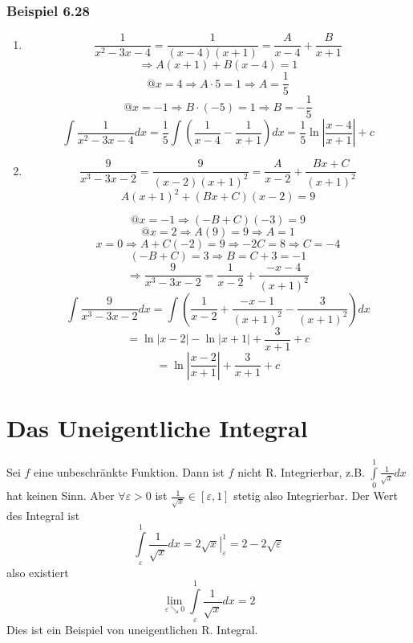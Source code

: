 \subsubsection*{Beispiel 6.28}
\begin{enumerate}
\item $$\frac{1}{x^2 -3x -4}=\frac{1}{(x-4)(x+1)}=\frac{A}{x-4}+\frac{B}{x+1}$$
$$\Rightarrow A(x+1)+B(x-4)=1$$
$$@x=4\Rightarrow A\cdot 5=1\Rightarrow A=\frac{1}{5}$$
$$@x=-1\Rightarrow B\cdot (-5)=1\Rightarrow B=-\frac{1}{5}$$
\[\int {\frac{1}{{{x^2} - 3x - 4}}dx = \frac{1}{5}\int {\left( {\frac{1}{{x - 4}} - \frac{1}{{x + 1}}} \right)dx = \frac{1}{5}} } \ln \left| {\frac{{x - 4}}{{x + 1}}} \right| + c\]
\item \[\frac{9}{{{x^3} - 3x - 2}} = \frac{9}{{(x - 2){{(x + 1)}^2}}} = \frac{A}{{x - 2}} + \frac{{Bx + C}}{{{{(x + 1)}^2}}}\]
\[A{(x + 1)^2} + (Bx + C)(x - 2) = 9\]

$$@x=-1\Rightarrow(-B+C)(-3)=9$$
$$@x=2\Rightarrow A(9)=9\Rightarrow A=1$$
$$x=0\Rightarrow A+C(-2)=9\Rightarrow -2C=8\Rightarrow C=-4$$
$$(-B+C)=3\Rightarrow B=C+3=-1$$
$$\Rightarrow \frac{9}{x^3-3x-2}=\frac{1}{x-2}+\frac{-x-4}{(x+1)^2}$$
\[\int {\frac{9}{{{x^3} - 3x - 2}}dx = \int {\left( {\frac{1}{{x - 2}} + \frac{{ - x - 1}}{{{{(x + 1)}^2}}} - \frac{3}{{{{(x + 1)}^2}}}} \right)dx} } \]
\[ = \ln \left| {x - 2} \right| - \ln \left| {x + 1} \right| + \frac{3}{{x + 1}} + c\]
\[ = \ln \left| {\frac{{x - 2}}{{x + 1}}} \right| + \frac{3}{{x + 1}} + c\]
\end{enumerate}
\section{Das Uneigentliche Integral}
Sei $f$ eine unbeschränkte Funktion. Dann ist $f$ nicht R. Integrierbar, z.B. $\int\limits_0^1 {\frac{1}{{\sqrt x }}} dx$ hat keinen Sinn. Aber $\forall\varepsilon>0$ ist $\frac{1}{\sqrt{x}}\in\left[\varepsilon,1 \right]$ stetig also Integrierbar. Der Wert des Integral ist \[\int\limits_\varepsilon ^1 {\frac{1}{{\sqrt x }}} dx = \left. {2\sqrt x } \right|_\varepsilon ^1 = 2 - 2\sqrt \varepsilon  \] also existiert \[\mathop {\lim }\limits_{\varepsilon  \searrow 0} \int\limits_\varepsilon ^1 {\frac{1}{{\sqrt x }}} dx = 2\] Dies ist ein Beispiel von uneigentlichen R. Integral.



